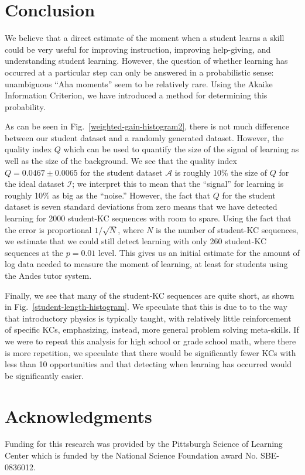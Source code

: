 \documentclass{edm_template}
\begin{document}
\section{Conclusion}

We believe that a direct estimate of the moment when a student
learns a skill could be very useful for improving instruction,
improving help-giving, and understanding student learning.
However, the question of whether learning has occurred at a particular
step can only be answered in a probabilistic sense:
unambiguous ``Aha moments'' seem to be relatively rare.
Using the Akaike Information Criterion, we have introduced a method
for determining this probability.

As can be seen in
Fig.~\ref{weighted-gain-histogram2}, there is not much difference
between our student dataset and a randomly generated dataset.  However,
the quality index $Q$ which can be used to quantify the
size of the signal of learning as well as the size of the background.  
We see that the quality index
$Q=0.0467\pm0.0065$ for the student dataset $\mathcal{A}$ is roughly
10\% the size of $Q$ for the ideal dataset $\mathcal{I}$; we interpret
this to mean that the ``signal'' for learning is roughly 10\% as big as the
``noise.''  However, the fact that $Q$ for the student dataset is
seven standard deviations from zero means that we have detected
learning for 2000 student-KC sequences with room to spare.  Using the fact
that the error is proportional $1/\sqrt{N}$, where $N$ is the number 
of student-KC sequences, we estimate
that we could still detect learning with only 260 student-KC sequences at the
$p=0.01$ level.  This gives us an initial estimate for the amount of
log data needed to measure the moment of learning, at least for
students using the Andes tutor system.

Finally, we see that many of
the student-KC sequences are quite short, as shown in
Fig.~\ref{student-length-histogram}. 
 We speculate that this
is due to to the way that introductory physics is typically taught, 
with relatively little reinforcement of specific KCs, emphasizing, 
instead, more general problem solving meta-skills.  If we were to 
repeat this
analysis for high school or grade school math, where there is more
repetition, we speculate that there would be significantly fewer KCs
with less than 10 opportunities and that detecting when learning has
occurred would be significantly easier.


\section{Acknowledgments}
Funding for this research was provided by the Pittsburgh Science of
Learning Center which is funded by the National Science Foundation
award No. SBE-0836012.


%
%

\end{document}

